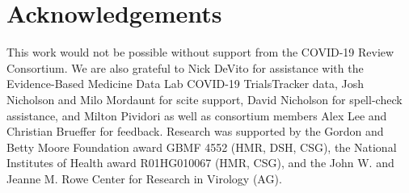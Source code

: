 \documentclass[twocolumn]{ceurart}
\begin{document}
\hypertarget{acknowledgements}{%
\section*{Acknowledgements}\label{acknowledgements}}

This work would not be possible without support from the COVID-19 Review Consortium.
We are also grateful to Nick DeVito for assistance with the Evidence-Based Medicine Data Lab COVID-19 TrialsTracker data, Josh Nicholson and Milo Mordaunt for scite support, David Nicholson for spell-check assistance, and Milton Pividori as well as consortium members Alex Lee and Christian Brueffer for feedback.
Research was supported by the Gordon and Betty Moore Foundation award GBMF 4552 (HMR, DSH, CSG), the National Institutes of Health award R01HG010067 (HMR, CSG), and the John W. and Jeanne M. Rowe Center for Research in Virology (AG).



\end{document}
